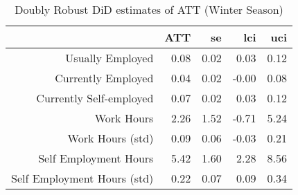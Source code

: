 \begin{table}[ht]
\centering
\begin{tabular}{rrrrr}
  \toprule
 & ATT & se & lci & uci \\ 
  \midrule
Usually Employed & 0.08 & 0.02 & 0.03 & 0.12 \\ 
  Currently Employed & 0.04 & 0.02 & -0.00 & 0.08 \\ 
  Currently Self-employed & 0.07 & 0.02 & 0.03 & 0.12 \\ 
  Work Hours & 2.26 & 1.52 & -0.71 & 5.24 \\ 
  Work Hours (std) & 0.09 & 0.06 & -0.03 & 0.21 \\ 
  Self Employment Hours & 5.42 & 1.60 & 2.28 & 8.56 \\ 
  Self Employment Hours (std) & 0.22 & 0.07 & 0.09 & 0.34 \\ 
   \bottomrule
\end{tabular}
\caption{Doubly Robust DiD estimates of ATT (Winter Season)} 
\end{table}
